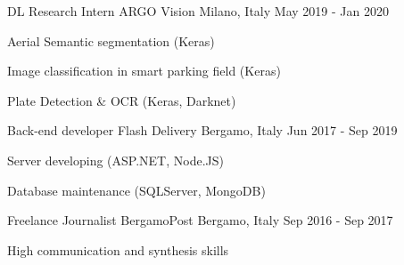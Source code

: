 

\begin{cventries}

  \cventry
    {DL Research Intern} %
    {ARGO Vision} %
    {Milano, Italy} %
    {May 2019 - Jan 2020} %
    {
      \begin{cvitems} %
      \item Aerial Semantic segmentation (Keras)
	  \item Image classification in smart parking field  (Keras)
	  \item Plate Detection \& OCR  (Keras, Darknet)
      \end{cvitems}
    }

  \cventry
    {Back-end developer} %
    {Flash Delivery} %
    {Bergamo, Italy} %
    {Jun 2017 - Sep 2019} %
    {
      \begin{cvitems} %
	    \item Server developing (ASP.NET, Node.JS)
		\item Database maintenance (SQLServer, MongoDB)
      \end{cvitems}
    }
  \cventry
    {Freelance Journalist} %
    {BergamoPost} %
    {Bergamo, Italy} %
    {Sep 2016 - Sep 2017} %
    {
      \begin{cvitems} %
			\item High communication and synthesis skills
      \end{cvitems}
    }

\end{cventries}
